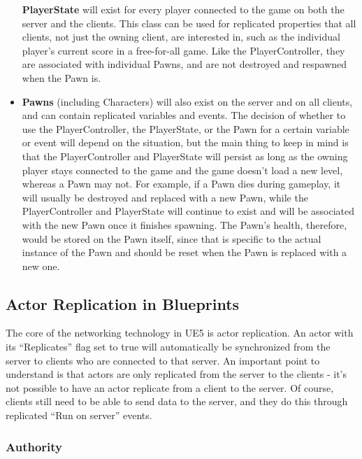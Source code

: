 \documentclass[
  letterpaper,
  DIV=11,
  numbers=noendperiod]{scrartcl}
\begin{document}
\begin{itemize}
  \textbf{PlayerState} will exist for every player connected to the game
  on both the server and the clients. This class can be used for
  replicated properties that all clients, not just the owning client,
  are interested in, such as the individual player's current score in a
  free-for-all game. Like the PlayerController, they are associated with
  individual Pawns, and are not destroyed and respawned when the Pawn
  is.
\item
  \textbf{Pawns} (including Characters) will also exist on the server
  and on all clients, and can contain replicated variables and events.
  The decision of whether to use the PlayerController, the PlayerState,
  or the Pawn for a certain variable or event will depend on the
  situation, but the main thing to keep in mind is that the
  PlayerController and PlayerState will persist as long as the owning
  player stays connected to the game and the game doesn't load a new
  level, whereas a Pawn may not. For example, if a Pawn dies during
  gameplay, it will usually be destroyed and replaced with a new Pawn,
  while the PlayerController and PlayerState will continue to exist and
  will be associated with the new Pawn once it finishes spawning. The
  Pawn's health, therefore, would be stored on the Pawn itself, since
  that is specific to the actual instance of the Pawn and should be
  reset when the Pawn is replaced with a new one.
\end{itemize}

\subsection{Actor Replication in
Blueprints}\label{actor-replication-in-blueprints}

The core of the networking technology in UE5 is actor replication. An
actor with its ``Replicates'' flag set to true will automatically be
synchronized from the server to clients who are connected to that
server. An important point to understand is that actors are only
replicated from the server to the clients - it's not possible to have an
actor replicate from a client to the server. Of course, clients still
need to be able to send data to the server, and they do this through
replicated ``Run on server'' events.

\subsubsection{Authority}\label{authority}
\end{document}
